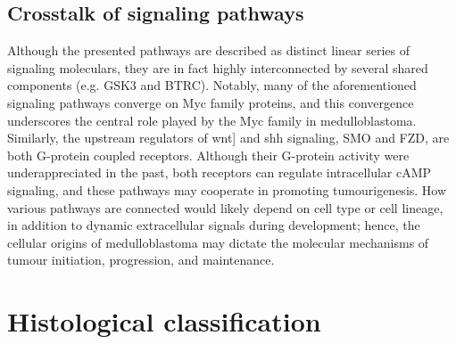 %
%
%
%
%


\subsection{Crosstalk of signaling pathways}

Although the presented pathways are described as distinct linear series of signaling moleculars, they are in fact highly interconnected by several shared components (e.g. GSK3 and BTRC). Notably, many of the aforementioned signaling pathways converge on Myc family proteins, and this convergence underscores the central role played by the Myc family in medulloblastoma. Similarly, the upstream regulators of \gls{wnt}] and \gls{shh} signaling, SMO and FZD, are both G-protein coupled receptors. Although their G-protein activity were underappreciated in the past, both receptors can regulate intracellular cAMP signaling, and these pathways may cooperate in promoting tumourigenesis. How various pathways are connected would likely depend on cell type or cell lineage, in addition to dynamic extracellular signals during development; hence, the cellular origins of medulloblastoma may dictate the molecular mechanisms of tumour initiation, progression, and maintenance.


\section{Histological classification}

